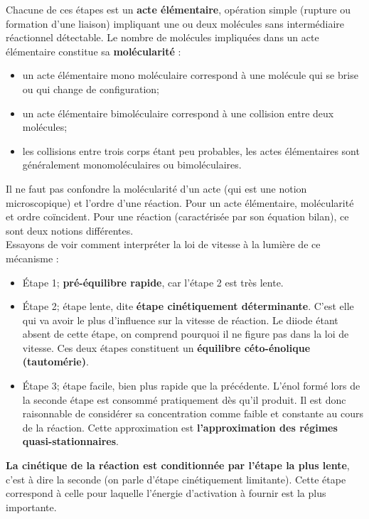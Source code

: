 \documentclass[11pt,a4paper]{report}
\begin{document}
Chacune de ces étapes est un \textbf{acte élémentaire}, opération simple (rupture ou formation d'une liaison) impliquant une ou deux molécules sans intermédiaire réactionnel détectable. Le nombre de molécules impliquées dans un acte élémentaire constitue sa \textbf{molécularité} :
\begin{itemize}
	\item un acte élémentaire mono moléculaire correspond à une molécule qui se brise ou qui change 			de configuration;
	\item un acte élémentaire bimoléculaire correspond à une collision entre deux molécules;
	\item les collisions entre trois corps étant peu probables, les actes élémentaires sont 					généralement monomoléculaires ou bimoléculaires.
\end{itemize}
Il ne faut pas confondre la molécularité d'un acte (qui est une notion microscopique) et l'ordre d'une réaction. Pour un acte élémentaire, molécularité et ordre coïncident. Pour une réaction (caractérisée par son équation bilan), ce sont deux notions différentes.\\

Essayons de voir comment interpréter la loi de vitesse à la lumière de ce mécanisme :
\begin{itemize}
	\item Étape 1; \textbf{pré-équilibre rapide}, car l'étape 2 est très lente.
	\item Étape 2; étape lente, dite \textbf{étape cinétiquement déterminante}. C'est elle qui va avoir le plus d'influence sur la vitesse de réaction. Le diiode étant absent de cette étape, on comprend pourquoi il ne figure pas dans la loi de vitesse.
	Ces deux étapes constituent un \textbf{équilibre céto-énolique (tautomérie)}.
	\item Étape 3; étape facile, bien plus rapide que la précédente. L'énol formé lors de la seconde étape est consommé pratiquement dès qu'il produit. Il est donc raisonnable de considérer sa concentration comme faible et constante au cours de la réaction. Cette approximation est \textbf{l'approximation des régimes quasi-stationnaires}.
\end{itemize}

\textbf{La cinétique de la réaction est conditionnée par l'étape la plus lente}, c'est à dire la seconde (on parle d'étape cinétiquement limitante). Cette étape correspond à celle pour laquelle l'énergie d'activation à fournir est la plus importante.
\end{document}
